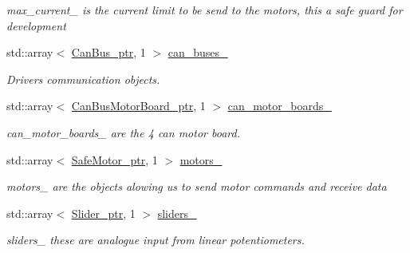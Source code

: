 \begin{DoxyCompactItemize}
\begin{DoxyCompactList}\small\item\em max\+\_\+current\+\_\+ is the current limit to be send to the motors, this a safe guard for development \end{DoxyCompactList}\item 
std\+::array$<$ \hyperlink{common__header_8hpp_a793c8789a7598e8aaf766939da7262af}{Can\+Bus\+\_\+ptr}, 1 $>$ \hyperlink{classblmc__robots_1_1SingleMotor_a6a57409cef4dc0959ed6b442e7626ba2}{can\+\_\+buses\+\_\+}
\begin{DoxyCompactList}\small\item\em Drivers communication objects. \end{DoxyCompactList}\item 
std\+::array$<$ \hyperlink{common__header_8hpp_aab1c6ddb1273247a1b45d5e8b417c216}{Can\+Bus\+Motor\+Board\+\_\+ptr}, 1 $>$ \hyperlink{classblmc__robots_1_1SingleMotor_a435394184e8e7325055685177fcf136d}{can\+\_\+motor\+\_\+boards\+\_\+}\hypertarget{classblmc__robots_1_1SingleMotor_a435394184e8e7325055685177fcf136d}{}\label{classblmc__robots_1_1SingleMotor_a435394184e8e7325055685177fcf136d}

\begin{DoxyCompactList}\small\item\em can\+\_\+motor\+\_\+boards\+\_\+ are the 4 can motor board. \end{DoxyCompactList}\item 
std\+::array$<$ \hyperlink{common__header_8hpp_a9850cf917156e20846aef3f8195aea0f}{Safe\+Motor\+\_\+ptr}, 1 $>$ \hyperlink{classblmc__robots_1_1SingleMotor_a0ea5ac9826c4a4cf31a422a904d45431}{motors\+\_\+}\hypertarget{classblmc__robots_1_1SingleMotor_a0ea5ac9826c4a4cf31a422a904d45431}{}\label{classblmc__robots_1_1SingleMotor_a0ea5ac9826c4a4cf31a422a904d45431}

\begin{DoxyCompactList}\small\item\em motors\+\_\+ are the objects alowing us to send motor commands and receive data \end{DoxyCompactList}\item 
std\+::array$<$ \hyperlink{common__header_8hpp_a4cb9a95e8b2c0bf237ce29f5252c7b73}{Slider\+\_\+ptr}, 1 $>$ \hyperlink{classblmc__robots_1_1SingleMotor_ae0f47f4ffeba39ecf870f1b2b9116503}{sliders\+\_\+}\hypertarget{classblmc__robots_1_1SingleMotor_ae0f47f4ffeba39ecf870f1b2b9116503}{}\label{classblmc__robots_1_1SingleMotor_ae0f47f4ffeba39ecf870f1b2b9116503}

\begin{DoxyCompactList}\small\item\em sliders\+\_\+ these are analogue input from linear potentiometers. \end{DoxyCompactList}\end{DoxyCompactItemize}



